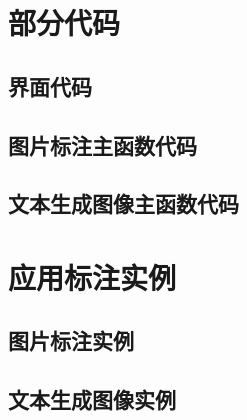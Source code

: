
\appendix

\chapter{部分代码}

\section{界面代码}

\section{图片标注主函数代码}

\section{文本生成图像主函数代码}

\chapter{应用标注实例}

\section{图片标注实例}

\section{文本生成图像实例}